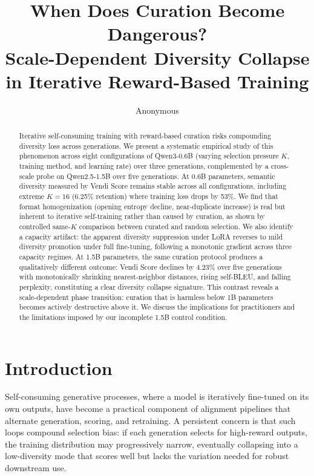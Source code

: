 \documentclass[11pt,a4paper]{article}
\title{When Does Curation Become Dangerous? \\
Scale-Dependent Diversity Collapse in Iterative Reward-Based Training}
\author{Anonymous}
\date{}
\begin{document}
\maketitle

\begin{abstract}
Iterative self-consuming training with reward-based curation risks compounding diversity loss across generations. We present a systematic empirical study of this phenomenon across eight configurations of Qwen3-0.6B (varying selection pressure $K$, training method, and learning rate) over three generations, complemented by a cross-scale probe on Qwen2.5-1.5B over five generations. At 0.6B parameters, semantic diversity measured by Vendi Score remains stable across all configurations, including extreme $K{=}16$ (6.25\% retention) where training loss drops by 53\%. We find that format homogenization (opening entropy decline, near-duplicate increase) is real but inherent to iterative self-training rather than caused by curation, as shown by controlled same-$K$ comparison between curated and random selection. We also identify a capacity artifact: the apparent diversity suppression under LoRA reverses to mild diversity promotion under full fine-tuning, following a monotonic gradient across three capacity regimes. At 1.5B parameters, the same curation protocol produces a qualitatively different outcome: Vendi Score declines by 4.23\% over five generations with monotonically shrinking nearest-neighbor distances, rising self-BLEU, and falling perplexity, constituting a clear diversity collapse signature. This contrast reveals a scale-dependent phase transition: curation that is harmless below 1B parameters becomes actively destructive above it. We discuss the implications for practitioners and the limitations imposed by our incomplete 1.5B control condition.
\end{abstract}

\section{Introduction}

Self-consuming generative processes, where a model is iteratively fine-tuned on its own outputs, have become a practical component of alignment pipelines that alternate generation, scoring, and retraining. A persistent concern is that such loops compound selection bias: if each generation selects for high-reward outputs, the training distribution may progressively narrow, eventually collapsing into a low-diversity mode that scores well but lacks the variation needed for robust downstream use.
\end{document}
